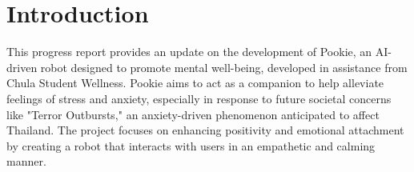 \section{Introduction}
This progress report provides an update on the development of Pookie, an AI-driven robot designed to promote mental well-being, developed in assistance from Chula Student Wellness. Pookie aims to act as a companion to help alleviate feelings of stress and anxiety, especially in response to future societal concerns like "Terror Outbursts," an anxiety-driven phenomenon anticipated to affect Thailand. The project focuses on enhancing positivity and emotional attachment by creating a robot that interacts with users in an empathetic and calming manner.
